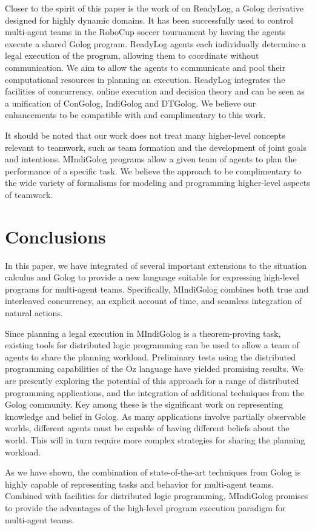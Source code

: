 \documentclass[letterpaper]{article}
\begin{document}
Closer to the spirit of this paper is the work of
\cite{Ferrein2005readylog} on ReadyLog, a Golog derivative designed
for highly dynamic domains. It has been successfully used to control
multi-agent teams in the RoboCup soccer tournament by having the agents
execute a shared Golog program. ReadyLog agents
each individually determine a legal execution of the program, allowing
them to coordinate without communication.  We aim to allow the agents to
communicate and pool their computational resources in planning an
execution.
ReadyLog integrates
the facilities of concurrency, online execution and decision theory
and can be seen as a unification of ConGolog, IndiGolog and DTGolog.
We believe our enhancements to be compatible with and complimentary 
to this work.

It should be noted that our work does not treat many higher-level concepts
relevant
to teamwork, such as team formation and the development of joint goals and
intentions.  MIndiGolog programs allow a given team of agents to
plan the performance of a specific task.  We believe the approach
to be complimentary to
the wide variety of formalisms for modeling and programming higher-level
aspects of teamwork.

\section{Conclusions}

In this paper, we have integrated of several important
extensions to the situation calculus and Golog to provide a new language
suitable for expressing high-level programs for multi-agent teams.
Specifically, MIndiGolog combines both true and interleaved concurrency,
an explicit account of time, and seamless integration of natural actions.

Since planning a legal execution in MIndiGolog is a theorem-proving
task, existing tools for distributed logic programming can be used to
allow a team of agents to share the planning workload.  Preliminary
tests using the distributed programming capabilities of the Oz language
\cite{schulte00oz_parallel} have yielded promising results.
We are presently exploring the potential of this approach for a range
of distributed programming applications, and the integration of additional
techniques from the Golog community. Key among
these is the significant work on representing knowledge and belief
in Golog. As many applications involve partially observable worlds,
different agents must be capable of having different beliefs about
the world.  This will in turn require more complex strategies for
sharing the planning workload.

As we have shown, the combination of state-of-the-art
techniques from Golog is highly capable of representing tasks and
behavior
for multi-agent teams. Combined with facilities for distributed logic
programming, MIndiGolog promises to provide the advantages of the high-level
program execution paradigm for multi-agent teams.



\end{document}
